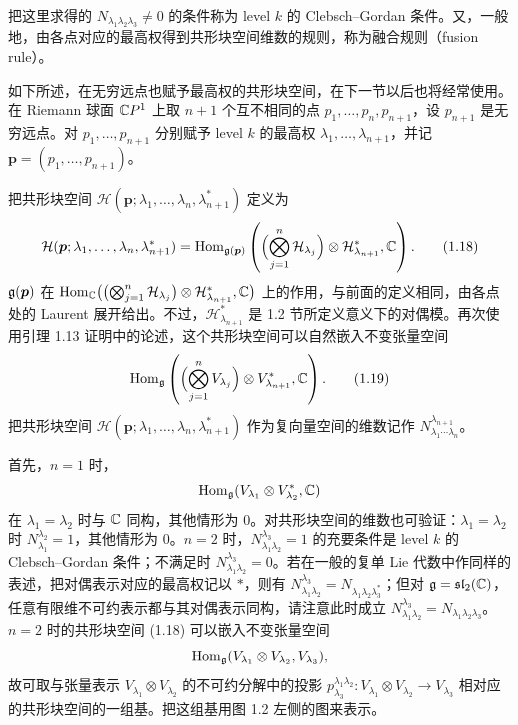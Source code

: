 把这里求得的 $N_{\lambda_1\lambda_2\lambda_3}\ne0$ 的条件称为 level $k$ 的 Clebsch--Gordan 条件。又，一般地，由各点对应的最高权得到共形块空间维数的规则，称为融合规则（fusion rule）。

如下所述，在无穷远点也赋予最高权的共形块空间，在下一节以后也将经常使用。在 Riemann 球面 $\mathbb{C}P^1$ 上取 $n+1$ 个互不相同的点 $p_1,\dots,p_n,p_{n+1}$，设 $p_{n+1}$ 是无穷远点。对 $p_1,\dots,p_{n+1}$ 分别赋予 level $k$ 的最高权 $\lambda_1,\dots,\lambda_{n+1}$，并记 $\bm p=(p_1,\dots,p_{n+1})$。

把共形块空间 $\mathcal{H}(\bm p;\lambda_1,\dots,\lambda_n,\lambda^{*}_{n+1})$ 定义为
\begin{equation}
  \mathcal{H}(\bm p;\lambda_1,\dots,\lambda_n,\lambda^{*}_{n+1})
  =\operatorname{Hom}_{\mathfrak{g}(\bm p)}\left(
  \Bigl(\bigotimes_{j=1}^{n}\mathcal{H}_{\lambda_j}\Bigr)\otimes\mathcal{H}^{*}_{\lambda_{n+1}},\mathbb{C}
  \right).
  \tag{1.18}
\end{equation}
$\mathfrak{g}(\bm p)$ 在
$\operatorname{Hom}_{\mathbb{C}}\bigl(\bigl(\bigotimes_{j=1}^{n}\mathcal{H}_{\lambda_j}\bigr)\otimes\mathcal{H}^{*}_{\lambda_{n+1}},\mathbb{C}\bigr)$
上的作用，与前面的定义相同，由各点处的 Laurent 展开给出。不过，$\mathcal{H}^{*}_{\lambda_{n+1}}$ 是 1.2 节所定义意义下的对偶模。再次使用引理 1.13 证明中的论述，这个共形块空间可以自然嵌入不变张量空间
\begin{equation}
  \operatorname{Hom}_{\mathfrak{g}}\left(
  \Bigl(\bigotimes_{j=1}^{n}V_{\lambda_j}\Bigr)\otimes V^{*}_{\lambda_{n+1}},\mathbb{C}
  \right).
  \tag{1.19}
\end{equation}
把共形块空间 $\mathcal{H}(\bm p;\lambda_1,\dots,\lambda_n,\lambda^{*}_{n+1})$ 作为复向量空间的维数记作 $N^{\lambda_{n+1}}_{\lambda_1\cdots\lambda_n}$。

首先，$n=1$ 时，
\[
  \operatorname{Hom}_{\mathfrak{g}}(V_{\lambda_1}\otimes V^{*}_{\lambda_2},\mathbb{C})
\]
在 $\lambda_1=\lambda_2$ 时与 $\mathbb{C}$ 同构，其他情形为 $0$。对共形块空间的维数也可验证：$\lambda_1=\lambda_2$ 时 $N^{\lambda_2}_{\lambda_1}=1$，其他情形为 $0$。$n=2$ 时，$N^{\lambda_3}_{\lambda_1\lambda_2}=1$ 的充要条件是 level $k$ 的 Clebsch--Gordan 条件；不满足时 $N^{\lambda_3}_{\lambda_1\lambda_2}=0$。若在一般的复单 Lie 代数中作同样的表述，把对偶表示对应的最高权记以 $*$，则有 $N^{\lambda_3}_{\lambda_1\lambda_2}=N_{\lambda_1\lambda_2\lambda^{*}_3}$；但对 $\mathfrak{g}=\mathfrak{sl}_2(\mathbb{C})$，任意有限维不可约表示都与其对偶表示同构，请注意此时成立 $N^{\lambda_3}_{\lambda_1\lambda_2}=N_{\lambda_1\lambda_2\lambda_3}$。$n=2$ 时的共形块空间 (1.18) 可以嵌入不变张量空间
\[
  \operatorname{Hom}_{\mathfrak{g}}(V_{\lambda_1}\otimes V_{\lambda_2},V_{\lambda_3}),
\]
故可取与张量表示 $V_{\lambda_1}\otimes V_{\lambda_2}$ 的不可约分解中的投影 $p^{\lambda_1\lambda_2}_{\lambda_3}\colon V_{\lambda_1}\otimes V_{\lambda_2}\to V_{\lambda_3}$ 相对应的共形块空间的一组基。把这组基用图 1.2 左侧的图来表示。


